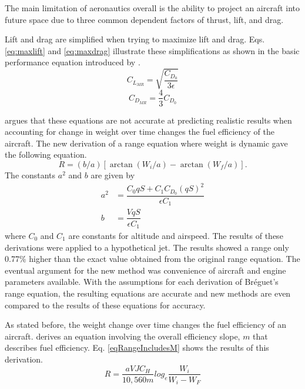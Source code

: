 The main limitation of aeronautics overall is the ability to project an aircraft into future space due to three common dependent factors of thrust, lift, and drag.\par
Lift and drag are simplified when trying to maximize lift and drag. Eqs. \ref{eq:maxlift} and \ref{eq:maxdrag} illustrate these simplifications as shown in the basic performance equation introduced by \cite{OptimizeBreguet}.
\begin{equation}
C_{L_{MR}} = \sqrt{\dfrac{C_{D_0}}{3\epsilon}}
\label{eq:maxlift}
\end{equation}
\begin{equation}
C_{D_{MR}} = \dfrac{4}{3}C_{D_0}
\label{eq:maxdrag}
\end{equation}
\par
\cite{Jonas1947} argues that these equations are not accurate at predicting realistic results when accounting for change in weight over time changes the fuel efficiency of the aircraft. The new derivation of a range equation where weight is dynamic gave the following equation.
\begin{equation}
    R = (b/a)[\arctan(W_i/a)-\arctan(W_f/a)].
    \label{eq:dynamicrange}
\end{equation}
The constants $a^2$ and $b$ are given by 
\begin{equation}
    \begin{aligned}
        a^2 &= \dfrac{C_0qS+C_1C_{D_0}(qS)^2}{\epsilon C_1}\\
        b &= \dfrac{VqS}{\epsilon C_1}
    \end{aligned}
\end{equation}
where $C_0$ and $C_1$ are constants for altitude and airspeed. The results of these derivations were applied to a hypothetical jet. The results showed a range only 0.77\% higher than the exact value obtained from the original range equation. The eventual argument for the new method was convenience of aircraft and engine parameters available. With the assumptions for each derivation of Br\'eguet's range equation, the resulting equations are accurate and new methods are even compared to the results of these equations for accuracy.\par
As stated before, the weight change over time changes the fuel efficiency of an aircraft. \cite{Jonas1947} derives an equation involving the overall efficiency slope, $m$ that describes fuel efficiency. Eq. \ref{eqRangeIncludesM} shows the results of this derivation.
\begin{equation}
    R = \dfrac{aVJC_H}{10,560m}log_e\dfrac{W_i}{W_i-W_F}
    \label{eqRangeIncludesM}
\end{equation}
